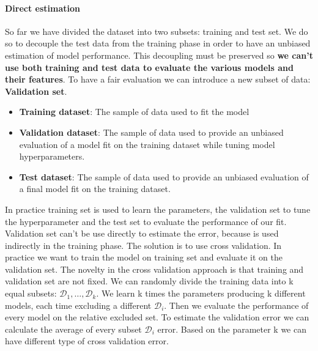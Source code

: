 \documentclass[main.tex]{subfiles}
\begin{document}
\paragraph{Direct estimation} 
So far we have divided the dataset into two subsets: training and test set. We do so to decouple the test data from the training phase in order to have an unbiased estimation of model performance. This decoupling must be preserved so \textbf{we can't use both training and test data to evaluate the various models and their features}. To have a fair evaluation we can introduce a new subset of data: \textbf{Validation set}. 
\begin{itemize}
    \item \textbf{Training dataset}: The sample of data used to fit the model
    \item \textbf{Validation dataset}: The sample of data used to provide an unbiased evaluation of a model fit on the training dataset while tuning model hyperparameters\footnotemark.
    \item \textbf{Test dataset}: The sample of data used to provide an unbiased evaluation of a final model fit on the training dataset.
\end{itemize}
In practice training set is used to learn the parameters, the validation set to tune the hyperparameter and the test set to evaluate the performance of our fit.
Validation set can't be use directly to estimate the error, because is used indirectly in the training phase. The solution is to use cross validation.
In practice we want to train the model on training set and evaluate it on the validation set. The novelty in the cross validation approach is that training and validation set are not fixed\footnotemark. 
We can randomly divide the training data into k equal subsets: $\mathcal{D}_1, \dots, \mathcal{D}_k$. We learn k times the parameters producing k different models, each time excluding a different $\mathcal{D}_i$. Then we evaluate the performance of every model on the relative excluded set. To estimate the validation error we can calculate the average of every subset $\mathcal{D}_i$ error. Based on the parameter k we can have different type of cross validation error.
\end{document}
